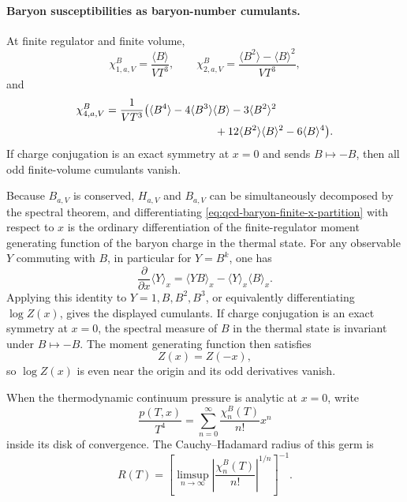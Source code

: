 \paragraph{Baryon susceptibilities as baryon-number cumulants.}
At finite regulator and finite volume,
\begin{equation}
  \chi_{1,a,V}^B
  =
  \frac{\langle B\rangle}{VT^3},
  \qquad
  \chi_{2,a,V}^B
  =
  \frac{\langle B^2\rangle-\langle B\rangle^2}{VT^3},
  \label{eq:qcd-baryon-first-second-cumulants}
\end{equation}
and
\begin{align}
  \chi_{4,a,V}^B
  &=
  \frac{1}{VT^3}
  \bigl(
  \langle B^4\rangle
  -4\langle B^3\rangle\langle B\rangle
  -3\langle B^2\rangle^2
  \notag\\
  &\hspace{3.5cm}
  +12\langle B^2\rangle\langle B\rangle^2
  -6\langle B\rangle^4
  \bigr).
  \label{eq:qcd-baryon-fourth-cumulant}
\end{align}
If charge conjugation is an exact symmetry at \(x=0\) and sends
\(B\mapsto -B\), then all odd finite-volume cumulants vanish.

Because \(B_{a,V}\) is conserved, \(H_{a,V}\) and \(B_{a,V}\) can be
simultaneously decomposed by the spectral theorem, and differentiating
\eqref{eq:qcd-baryon-finite-x-partition} with respect to \(x\) is the
ordinary differentiation of the finite-regulator moment generating function
of the baryon charge in the thermal state.  For any observable \(Y\) commuting
with \(B\), in particular for \(Y=B^k\), one has
\begin{equation}
  \frac{\partial}{\partial x}\langle Y\rangle_x
  =
  \langle YB\rangle_x-\langle Y\rangle_x\langle B\rangle_x .
  \label{eq:qcd-baryon-source-derivative-expectation}
\end{equation}
Applying this identity to \(Y=1,B,B^2,B^3\), or equivalently differentiating
\(\log Z(x)\), gives the displayed cumulants.  If charge conjugation is an
exact symmetry at \(x=0\), the spectral measure of \(B\) in the thermal state
is invariant under \(B\mapsto -B\).  The moment generating function then
satisfies
\[
  Z(x)=Z(-x),
\]
so \(\log Z(x)\) is even near the origin and its odd derivatives vanish.

\begin{definition}
\label{def:qcd-baryon-taylor-critical-diagnostic}
When the thermodynamic continuum pressure is analytic at \(x=0\), write
\begin{equation}
  \frac{p(T,x)}{T^4}
  =
  \sum_{n=0}^{\infty}
  \frac{\chi_n^B(T)}{n!}x^n
  \label{eq:qcd-baryon-pressure-taylor}
\end{equation}
inside its disk of convergence.  The Cauchy--Hadamard radius of this germ is
\begin{equation}
  R(T)
  =
  \left[
  \limsup_{n\to\infty}
  \left|
  \frac{\chi_n^B(T)}{n!}
  \right|^{1/n}
  \right]^{-1}.
  \label{eq:qcd-baryon-cauchy-hadamard-radius}
\end{equation}
\end{definition}

